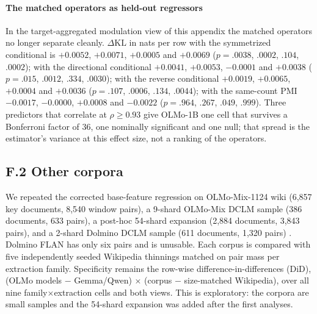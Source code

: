 \documentclass[11pt]{article}
\newcommand{\KL}{\mathrm{KL}}
\begin{document}
\paragraph{The matched operators as held-out regressors} In the target-aggregated modulation view of this appendix the matched operators no longer separate cleanly. $\Delta\KL$ in nats per row with the symmetrized conditional is $+0.0052$, $+0.0071$, $+0.0005$ and $+0.0069$ ($p=.0038$, $.0002$, $.104$, $.0002$); with the directional conditional $+0.0041$, $+0.0053$, $-0.0001$ and $+0.0038$ ($p=.015$, $.0012$, $.334$, $.0030$); with the reverse conditional $+0.0019$, $+0.0065$, $+0.0004$ and $+0.0036$ ($p=.107$, $.0006$, $.134$, $.0044$); with the same-count PMI $-0.0017$, $-0.0000$, $+0.0008$ and $-0.0022$ ($p=.964$, $.267$, $.049$, $.999$). Three predictors that correlate at $\rho\ge0.93$ give OLMo-1B one cell that survives a Bonferroni factor of 36, one nominally significant and one null; that spread is the estimator's variance at this effect size, not a ranking of the operators.

\subsection*{F.2 Other corpora}

We repeated the corrected base-feature regression on OLMo-Mix-1124 wiki (6,857 key documents, 8,540 window pairs), a 9-shard OLMo-Mix DCLM sample (386 documents, 633 pairs), a post-hoc 54-shard expansion (2,884 documents, 3,843 pairs), and a 2-shard Dolmino DCLM sample (611 documents, 1,320 pairs) \citep{olmo2,dclm2024}. Dolmino FLAN has only six pairs and is unusable. Each corpus is compared with five independently seeded Wikipedia thinnings matched on pair mass per extraction family. Specificity remains the row-wise difference-in-differences (DiD), (OLMo models $-$ Gemma/Qwen) $\times$ (corpus $-$ size-matched Wikipedia), over all nine family$\times$extraction cells and both views. This is exploratory: the corpora are small samples and the 54-shard expansion was added after the first analyses.
\end{document}
